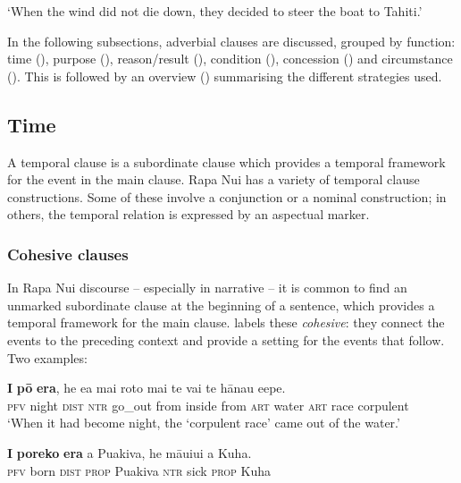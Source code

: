 \glt
‘When the wind did not die down, they decided to steer the boat to Tahiti.’ \textstyleExampleref{[R303.064]} 
\z

In the following subsections, adverbial clauses are discussed, grouped by function: time (), purpose (), reason/result (), condition (), concession () and circumstance (). This is followed by an overview () summarising the different strategies used.

\subsection{Time}\label{sec:11.6.2}
A temporal clause is a subordinate clause which provides a temporal framework for the event in the main clause. Rapa Nui has a variety of temporal clause constructions. Some of these involve a conjunction or a nominal construction; in others, the temporal relation is expressed by an aspectual marker.

\subsubsection[Cohesive clauses]{Cohesive clauses}\label{sec:11.6.2.1}
In Rapa Nui discourse – especially in narrative – it is common to find an unmarked subordinate clause at the beginning of a sentence, which provides a temporal framework for the main clause. \citet[116]{WeberR2003} labels these \textit{cohesive}: they connect the events to the preceding context and provide a setting for the events that follow. Two examples: 

\ea\label{ex:11.211}
\gll \textbf{I} \textbf{pō} \textbf{era}, he e{\ꞌ}a mai roto mai te vai te hānau {\ꞌ}e{\ꞌ}epe. \\
\textsc{pfv} night \textsc{dist} \textsc{ntr} go\_out from inside from \textsc{art} water \textsc{art} race corpulent \\

\glt 
‘When it had become night, the ‘corpulent race’ came out of the water.’ \textstyleExampleref{[Ley-3-06.046]}
\z

\ea\label{ex:11.212}
\gll \textbf{I} \textbf{poreko} \textbf{era} a Puakiva, he māuiui a Kuha. \\
\textsc{pfv} born \textsc{dist} \textsc{prop} Puakiva \textsc{ntr} sick \textsc{prop} Kuha \\

